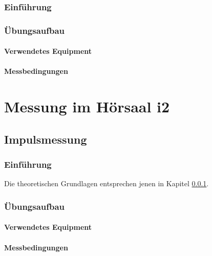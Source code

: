 \documentclass[11pt]{report}
\begin{document}
\subsubsection{Einführung}
\label{Impulseinfuehrung}
\subsubsection{Übungsaufbau}
\paragraph{Verwendetes Equipment}
\paragraph{Messbedingungen}
\section{Messung im Hörsaal i2}
\subsection{Impulsmessung}
\subsubsection{Einführung}
Die theoretischen Grundlagen entsprechen jenen in Kapitel \ref{Impulseinfuehrung}.
\subsubsection{Übungsaufbau}
\paragraph{Verwendetes Equipment}
\paragraph{Messbedingungen}


\end{document}
